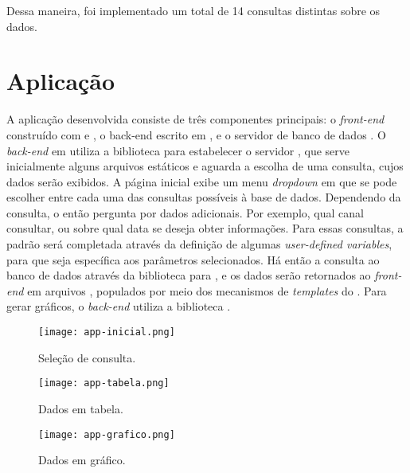   Dessa maneira, foi implementado um total de 14 consultas distintas sobre os dados.


\chapter{Aplicação}

  A aplicação desenvolvida consiste de três componentes principais: o \emph{front-end} construído com
   e ,
  o back-end escrito em , e o servidor de banco de dados . O \emph{back-end} em 
  utiliza a biblioteca
   para estabelecer o servidor , que serve inicialmente alguns arquivos estáticos e aguarda a escolha de uma
  consulta, cujos dados serão exibidos. A página inicial exibe um menu \emph{dropdown} em que se pode escolher entre cada
  uma das consultas possíveis à base de dados. Dependendo da consulta, o  então pergunta por dados adicionais. Por exemplo,
  qual canal consultar, ou sobre qual data se deseja obter informações. Para essas consultas, a  padrão será
  completada através da definição de algumas \emph{user-defined variables}, para que seja específica aos parâmetros
  selecionados. Há então a consulta ao banco de dados através da biblioteca  para , e os dados
  serão retornados ao \emph{front-end} em arquivos , populados por meio dos mecanismos de \emph{templates} do .
  Para gerar gráficos, o \emph{back-end} utiliza a biblioteca .

  \begin{figure}[H]
    \centering
    \texttt{[image: app-inicial.png]}
    \caption{Seleção de consulta.}
  \end{figure}

  \begin{figure}[H]
    \centering
    \texttt{[image: app-tabela.png]}
    \caption{Dados em tabela.}
  \end{figure}

  \begin{figure}[H]
    \centering
    \texttt{[image: app-grafico.png]}
    \caption{Dados em gráfico.}
  \end{figure}


